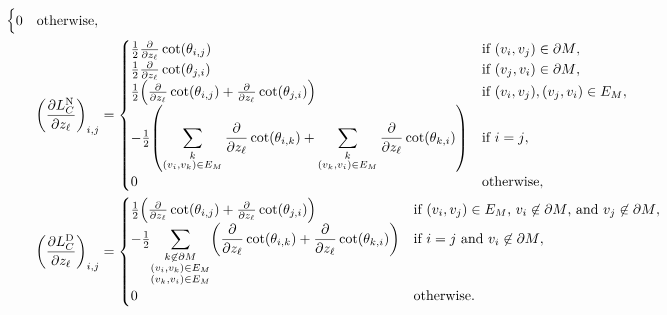 \begin{align*}
\begin{cases}
		0 & \text{otherwise},
	\end{cases} \\
	\pof{\frac{\partial L_C^{\text{N}}}{\partial z_\ell}}_{i, j} &= \begin{cases}
		\frac{1}{2}\frac{\partial}{\partial z_\ell}\cot\pof{\theta_{i, j}} & \text{if \(\pof{v_i, v_j} \in \partial M\)}, \\
		\frac{1}{2}\frac{\partial}{\partial z_\ell}\cot\pof{\theta_{j, i}} & \text{if \(\pof{v_j, v_i} \in \partial M\)}, \\
		\frac{1}{2}\pof{\frac{\partial}{\partial z_\ell}\cot\pof{\theta_{i, j}} + \frac{\partial}{\partial z_\ell}\cot\pof{\theta_{j, i}}} & \text{if \(\pof{v_i, v_j}, \pof{v_j, v_i} \in E_M\)}, \\
		-\frac{1}{2}\pof{\displaystyle\sum_{\substack{k \\ \pof{v_i, v_k} \in E_M}}\frac{\partial}{\partial z_\ell}\cot\pof{\theta_{i, k}} + \sum_{\substack{k \\ \pof{v_k, v_i} \in E_M}}\frac{\partial}{\partial z_\ell}\cot\pof{\theta_{k, i}}} & \text{if \(i = j\)}, \\
		0 & \text{otherwise},
	\end{cases} \\
	\pof{\frac{\partial L_C^{\text{D}}}{\partial z_\ell}}_{i, j} &= \begin{cases}
		\frac{1}{2}\pof{\frac{\partial}{\partial z_\ell}\cot\pof{\theta_{i, j}} + \frac{\partial}{\partial z_\ell}\cot\pof{\theta_{j, i}}} & \text{if \(\pof{v_i, v_j} \in E_M\), \(v_i \not\in \partial M\), and \(v_j \not\in \partial M\)}, \\
		-\frac{1}{2}{\displaystyle\sum_{\substack{k \not\in \partial M \\ \pof{v_i, v_k} \in E_M \\ \pof{v_k, v_i} \in E_M}}\pof{\frac{\partial}{\partial z_\ell}\cot\pof{\theta_{i, k}} + \frac{\partial}{\partial z_\ell}\cot\pof{\theta_{k, i}}}} & \text{if \(i = j\) and \(v_i \not\in \partial M\)}, \\
		0 & \text{otherwise}.
	\end{cases}
\end{align*}
